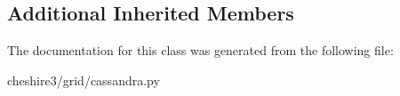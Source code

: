 \subsection*{Additional Inherited Members}


The documentation for this class was generated from the following file\-:\begin{DoxyCompactItemize}
\item 
cheshire3/grid/cassandra.\-py\end{DoxyCompactItemize}
